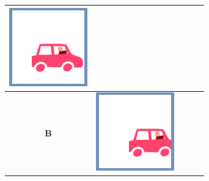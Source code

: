 \documentclass[12pt, a4paper]{article}
\begin{document}
\begin{minipage}{\textwidth}
\begin{table}[H]
\begin{tabulary}{\linewidth}{|C|CCCC|}
				\vspace{0.01cm}\includegraphics[width=\linewidth]{option3}
				\\ \hline 
				\textbf{B} &
				\vspace{0.01cm}\includegraphics[width=\linewidth]{option4} &

\end{tabulary}
\end{table}
\end{minipage}
\end{document}
